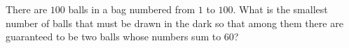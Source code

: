 There are $100$ balls in a bag numbered from $1$ to $100$. What is the smallest number of balls that must be drawn in the dark so that among them there are guaranteed to be two balls whose numbers sum to $60$?
